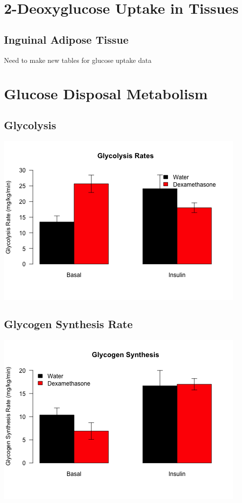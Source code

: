 \documentclass[]{article}
\begin{document}
\section{2-Deoxyglucose Uptake in
Tissues}\label{deoxyglucose-uptake-in-tissues}

\subsection{Inguinal Adipose Tissue}\label{inguinal-adipose-tissue}

Need to make new tables for glucose uptake data

\section{Glucose Disposal Metabolism}\label{glucose-disposal-metabolism}

\subsection{Glycolysis}\label{glycolysis}

\includegraphics{figures/glycolysis-barplot-hfd-1.png}

\subsection{Glycogen Synthesis Rate}\label{glycogen-synthesis-rate}

\includegraphics{figures/glycogen-barplot-hfd-1.png}
\end{document}
